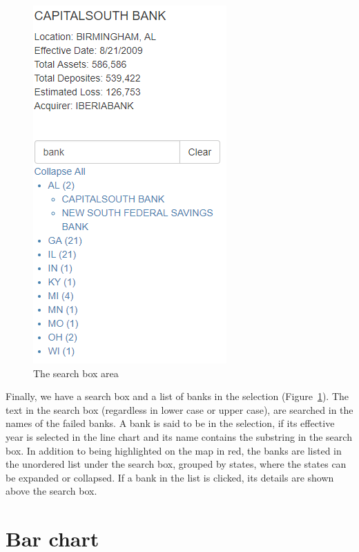 \begin{figure}[!h]
    \centering
    \includegraphics{fig/searchbox}
    \caption{The search box area}
    \label{fig:searchbox}
\end{figure}
Finally, we have a search box and a list of banks in the selection
(Figure~\ref{fig:searchbox}). The text in the search box (regardless in lower
case or upper case), are searched in the names of the failed banks. A bank is
said to be in the selection, if its effective year is selected in the line
chart and its name contains the substring in the search box. In addition to
being highlighted on the map in red, the banks are listed in the unordered
list under the search box, grouped by states, where the states can be expanded
or collapsed. If a bank in the list is clicked, its details are shown above
the search box.


\newpage

\section{Bar chart}

